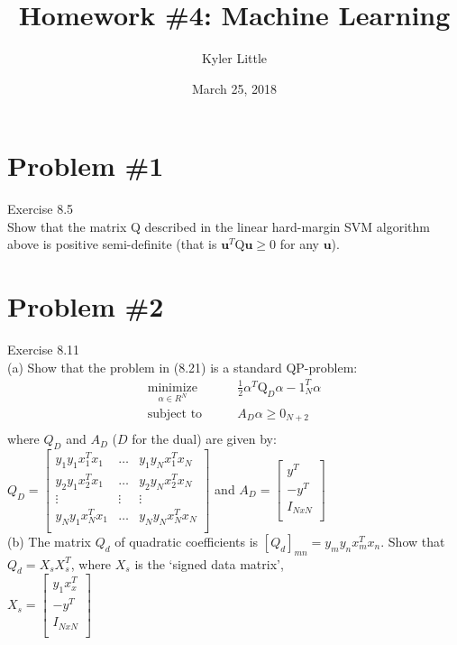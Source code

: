\documentclass[12pt]{article}
\author{Kyler Little\vspace{-0.6cm}}
\title{Homework \#4: Machine Learning\vspace{-0.3cm}}
\date{March 25, 2018\vspace{-0.7cm}}
\begin{document}
	\maketitle
	\section*{Problem \#1}
		Exercise 8.5 \\ 
		Show that the matrix Q described in the linear hard-margin SVM algorithm above is positive semi-definite (that is $\boldsymbol{u}^T \text{Q}\boldsymbol{u} \ge 0$ for any $\boldsymbol{u}$).
	 
	\section*{Problem \#2}
	Exercise 8.11 \\
	(a) Show that the problem in (8.21) is a standard QP-problem:
	\begin{align*}
	\underset{\alpha \in R^{N}}{\text{minimize}} &\qquad \frac{1}{2}\alpha^T\text{Q}_D\alpha-1_{N}^{T}\alpha \\
	\text{subject to} & \qquad A_D\alpha \ge 0_{N+2} \\
	\end{align*}
	where $Q_D$ and $A_D$ ($D$ for the dual) are given by:\\
	$Q_D = \left[
	\begin{array}{ccc}
		y_1y_1x_1^Tx_1&\dots&y_1y_Nx_1^Tx_N \\
		y_2y_1x_2^Tx_1&\dots&y_2y_Nx_2^Tx_N \\
		\vdots & \vdots & \vdots \\
		y_Ny_1x_N^Tx_1&\dots&y_Ny_Nx_N^Tx_N \\
	\end{array}
	\right]$ and $A_D = \left[ 
	\begin{array}{c}
		y^T\\
		-y^T\\
		I_{N x N}\\
	\end{array} \right]$ \\
	(b) The matrix $Q_d$ of quadratic coefficients is $[Q_d]_{mn} = y_m y_n x^T_m x_n$.
	Show that $Q_d = X_s X^T_s$, where $X_s$ is the `signed data matrix',\\ 
	$X_s = \left[
	\begin{array}{c}
	y_1x_x^T\\
	-y^T\\
	I_{N x N}\\
	\end{array} \right]$ \\
	
\end{document}
